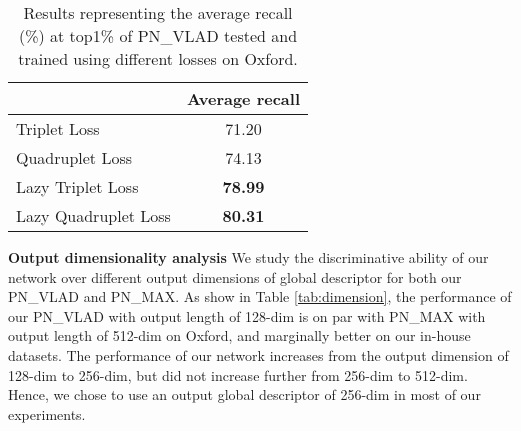 \documentclass[10pt,twocolumn,letterpaper]{article}
\begin{document}
\begin{table}
	\begin{center}
		\begin{tabular}{|l|c|}
			\hline
			& Average recall\\
			\hline
			Triplet Loss& 71.20\\
			\hline
			Quadruplet Loss& 74.13\\
			\hline
			Lazy Triplet Loss& \textbf{78.99}\\
			\hline
			Lazy Quadruplet Loss& \textbf{80.31}\\
			\hline			
		\end{tabular}
	\end{center}
	\vspace{-0.1cm}
	\caption{Results representing the average recall (\%) at top1\% of PN\_VLAD tested and trained using different losses on Oxford.\vspace{-0.3cm} }
	\label{tab:losses}
\end{table}




\vspace{-0.2cm}
\noindent\textbf{Output dimensionality analysis} We study the discriminative ability of our network over different output dimensions of global descriptor  for both our PN\_VLAD and PN\_MAX. As show in Table \ref{tab:dimension}, 
the performance of our PN\_VLAD with output length of 128-dim is on par with PN\_MAX with output length of 512-dim on Oxford, and marginally better on our in-house datasets.
The performance of our network increases from the output dimension of 128-dim to 256-dim, but did not increase further from 256-dim to 512-dim. Hence, we chose to use an output global descriptor of 256-dim in most of our experiments.
\newline
\vspace{-0.2cm}
\end{document}
